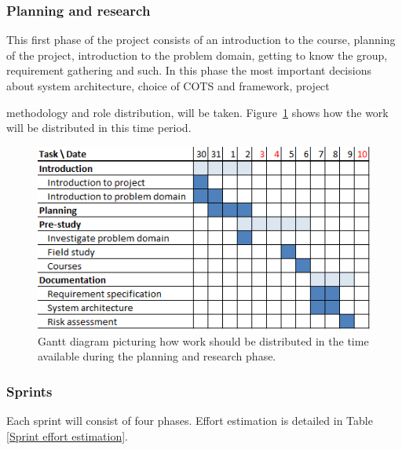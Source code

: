 \subsubsection{Planning and research}

This first phase of the project consists of an introduction to the course,
planning of the project, introduction to the problem domain, getting to know
the group, requirement gathering and such. In this phase the most important
decisions about system architecture, choice of COTS and framework, project

methodology and role distribution, will be taken. Figure~\ref{gantt:pre_imp}
shows how the work will be distributed in this time period.

\begin{figure}[h]
\centering
  \includegraphics[width=1.0\textwidth]{project_management/pre_implementation_gantt}
  \caption[Gantt chart of planning and research phase]{Gantt diagram picturing how work should be distributed in the time available during the planning and research phase.}
  \label{gantt:pre_imp}
\end{figure}

\subsubsection{Sprints}

Each sprint will consist of four phases. Effort estimation is
detailed in Table \ref{Sprint effort estimation}.

